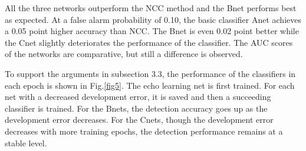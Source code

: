 \documentclass[a4paper]{article}
\begin{document}
All the three networks outperform the NCC method and the Bnet performs best as expected. At a false alarm probability of 0.10, the basic classifier Anet achieves a 0.05 point higher accuracy than NCC. The Bnet is even 0.02 point better while the Cnet slightly deteriorates the performance of the classifier. The AUC scores of the networks are comparative, but still a difference is observed.

To support the arguments in subsection 3.3, the performance of the classifiers in each epoch is shown in   Fig.\ref{fig5}. The echo learning net is first trained. For each net with a decreased development error, it is saved and then a succeeding classifier is trained. For the Bnets, the detection accuracy goes up as the development error decreases. For the Cnets, though the development error decreases with more training epochs, the detection performance remains at a stable level.
\end{document}
